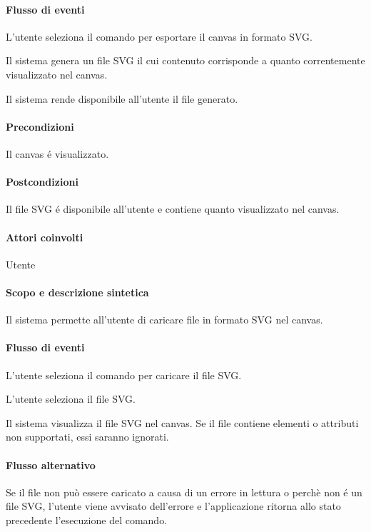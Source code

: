 \paragraph{Flusso di eventi}
\begin{elenconumerato}[\textbf{}]{\subsubsecindent}
\item L'utente seleziona il comando per esportare il canvas in formato SVG.
\item Il sistema genera un file SVG il cui contenuto corrisponde a quanto correntemente visualizzato nel canvas.
\item Il sistema rende disponibile all'utente il file generato.
\end{elenconumerato}
\paragraph{Precondizioni} Il canvas \'e visualizzato.
\paragraph{Postcondizioni} Il file SVG \'e disponibile all'utente e contiene quanto visualizzato nel canvas.

\paragraph{Attori coinvolti} Utente
\paragraph{Scopo e descrizione sintetica} 
Il sistema permette all'utente di caricare file in formato SVG nel canvas.
\paragraph{Flusso di eventi}
\begin{elenconumerato}[\textbf{}]{\subsubsecindent}
\item L'utente seleziona il comando per caricare il file SVG.
\item L'utente seleziona il file SVG.
\item Il sistema visualizza il file SVG nel canvas. Se il file contiene elementi o attributi non supportati, essi saranno ignorati.
\end{elenconumerato}
\paragraph{Flusso alternativo}
Se il file non pu\`o essere caricato a causa di un errore in lettura o perch\`e non \'e un file SVG, l'utente viene avvisato dell'errore e l'applicazione ritorna allo stato precedente l'esecuzione del comando.

